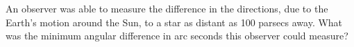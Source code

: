 An observer was able to measure the difference in the directions, due to the
Earth's motion around the Sun, to a star as distant as 100 parsecs away. What
was the minimum angular difference in arc seconds this observer could measure?
